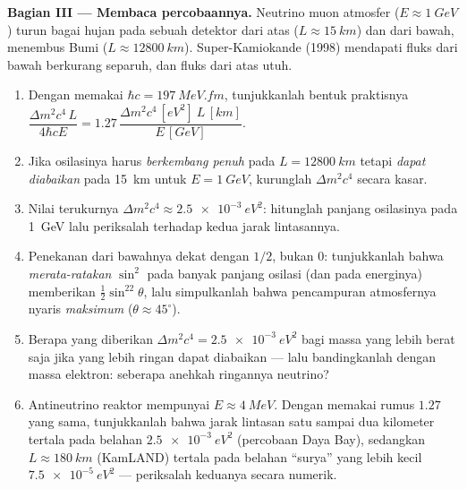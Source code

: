 \begin{problem}
\medskip\noindent\textbf{Bagian III --- Membaca percobaannya.}
Neutrino muon atmosfer ($E \approx \qty{1}{GeV}$) turun bagai hujan pada
sebuah detektor dari atas ($L \approx \qty{15}{km}$) dan dari bawah,
menembus Bumi ($L \approx \qty{12800}{km}$). Super-Kamiokande
(1998) mendapati fluks dari bawah berkurang separuh, dan fluks dari atas utuh.
\begin{enumerate}[resume]
  \item Dengan memakai $\hbar c = \qty{197}{MeV.fm}$, tunjukkanlah bentuk praktisnya
        $\dfrac{\Delta m^2c^4\,L}{4\hbar cE} = 1.27\,
        \dfrac{\Delta m^2c^4\,[\unit{eV^2}]\ L\,[\unit{km}]}
        {E\,[\unit{GeV}]}$.
  \item Jika osilasinya harus \emph{berkembang penuh} pada $L =
        \qty{12800}{km}$ tetapi \emph{dapat diabaikan} pada \qty{15}{km}
        untuk $E = \qty{1}{GeV}$, kurunglah $\Delta m^2c^4$ secara kasar.
  \item Nilai terukurnya $\Delta m^2c^4 \approx
        \qty{2.5e-3}{eV^2}$: hitunglah panjang osilasinya pada
        \qty{1}{GeV} lalu periksalah terhadap kedua jarak lintasannya.
  \item Penekanan dari bawahnya dekat dengan $1/2$, bukan $0$:
        tunjukkanlah bahwa \emph{merata-ratakan} $\sin^2$ pada banyak
        panjang osilasi (dan pada energinya) memberikan
        $\tfrac12\sin^22\theta$, lalu simpulkanlah bahwa pencampuran
        atmosfernya nyaris \emph{maksimum} ($\theta \approx 45^\circ$).
  \item Berapa yang diberikan $\Delta m^2c^4 = \qty{2.5e-3}{eV^2}$ bagi
        massa yang lebih berat saja jika yang lebih ringan dapat
        diabaikan --- lalu bandingkanlah dengan massa elektron: seberapa
        anehkah ringannya neutrino?
  \item Antineutrino reaktor mempunyai $E \approx \qty{4}{MeV}$. Dengan
        memakai rumus $1.27$ yang sama, tunjukkanlah bahwa jarak lintasan
        satu sampai dua kilometer tertala pada belahan
        $\qty{2.5e-3}{eV^2}$ (percobaan Daya Bay), sedangkan
        $L \approx \qty{180}{km}$ (KamLAND) tertala pada belahan ``surya''
        yang lebih kecil $\qty{7.5e-5}{eV^2}$ --- periksalah keduanya
        secara numerik.
\end{enumerate}


\end{problem}
